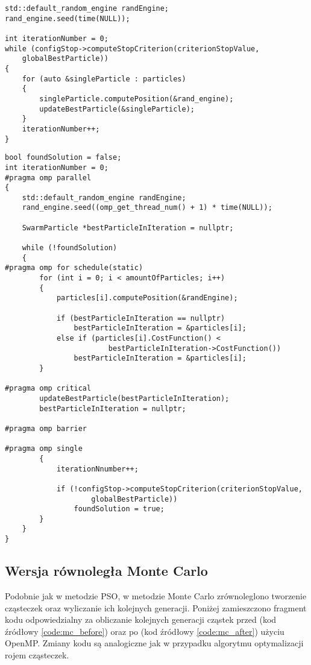 \documentclass[11pt, a4paper, oneside]{article}
\begin{document}
\begin{lstlisting}[style=mycpp, label=code:pso_before, caption={Optymalizacja PSO - kod sekwencyjny.}]
std::default_random_engine randEngine;
rand_engine.seed(time(NULL));

int iterationNumber = 0;
while (configStop->computeStopCriterion(criterionStopValue,
	globalBestParticle))
{
    for (auto &singleParticle : particles)
    {
        singleParticle.computePosition(&rand_engine);
        updateBestParticle(&singleParticle);
    }
    iterationNumber++;
}
\end{lstlisting}

\begin{lstlisting}[style=mycpp, label=code:pso_after, caption={Optymalizacja PSO - kod równoległy.}]
bool foundSolution = false;
int iterationNumber = 0;
#pragma omp parallel
{
    std::default_random_engine randEngine;
    rand_engine.seed((omp_get_thread_num() + 1) * time(NULL));

    SwarmParticle *bestParticleInIteration = nullptr;

    while (!foundSolution)
    {
#pragma omp for schedule(static)
        for (int i = 0; i < amountOfParticles; i++)
        {
            particles[i].computePosition(&randEngine);

            if (bestParticleInIteration == nullptr)
                bestParticleInIteration = &particles[i];
            else if (particles[i].CostFunction() <
                        bestParticleInIteration->CostFunction())
                bestParticleInIteration = &particles[i];
        }

#pragma omp critical
        updateBestParticle(bestParticleInIteration);
        bestParticleInIteration = nullptr;

#pragma omp barrier

#pragma omp single
        {
            iterationNnumber++;

            if (!configStop->computeStopCriterion(criterionStopValue,
                    globalBestParticle))
                foundSolution = true;
        }
    }
}
\end{lstlisting}

\subsection{Wersja równoległa Monte Carlo}

Podobnie jak w metodzie PSO, w metodzie Monte Carlo zrównoleglono tworzenie cząsteczek oraz wyliczanie ich kolejnych generacji. Poniżej zamieszczono fragment kodu odpowiedzialny za obliczanie kolejnych generacji cząstek przed (kod źródłowy \ref{code:mc_before}) oraz po (kod źródłowy \ref{code:mc_after}) użyciu OpenMP. Zmiany kodu są analogiczne jak w przypadku algorytmu optymalizacji rojem cząsteczek.
\end{document}
